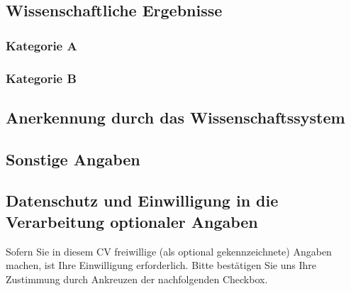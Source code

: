 \documentclass{scrartcl}
\begin{document}
\subsection*{Wissenschaftliche Ergebnisse}
\nocite{*}

\subsubsection*{Kategorie A}
\printbibliography[category=reviewed, heading=none]

\subsubsection*{Kategorie B}
\printbibliography[category=nonreviewed, heading=none]

\subsection*{Anerkennung durch das Wissenschaftssystem}

\subsection*{Sonstige Angaben}

\subsection*{Datenschutz und Einwilligung in die Verarbeitung optionaler Angaben}

Sofern Sie in diesem CV freiwillige (als optional gekennzeichnete) Angaben machen, ist Ihre Einwilligung erforderlich.
Bitte bestätigen Sie uns Ihre Zustimmung durch Ankreuzen der nachfolgenden Checkbox.
\end{document}
